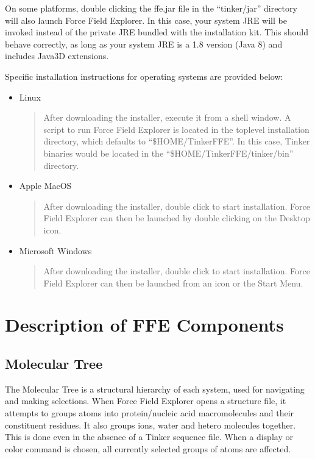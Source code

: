 \documentclass[letterpaper,11pt,english]{sphinxmanual}
\begin{document}
On some platforms, double clicking the ffe.jar file in the “tinker/jar” directory will also launch Force Field Explorer. In this case, your system JRE will be invoked instead of the private JRE bundled with the installation kit. This should behave correctly, as long as your system JRE is a 1.8 version (Java 8) and includes Java3D extensions.

Specific installation instructions for operating systems are provided below:
\begin{itemize}
\item {} 
Linux
\begin{quote}

After downloading the installer, execute it from a shell window. A script to run Force Field Explorer is located in the top\sphinxhyphen{}level installation directory, which defaults to “\$HOME/Tinker\sphinxhyphen{}FFE”. In this case, Tinker binaries would be located in the “\$HOME/Tinker\sphinxhyphen{}FFE/tinker/bin” directory.
\end{quote}

\item {} 
Apple MacOS
\begin{quote}

After downloading the installer, double click to start installation. Force Field Explorer can then be launched by double clicking on the Desktop icon.
\end{quote}

\item {} 
Microsoft Windows
\begin{quote}

After downloading the installer, double click to start installation. Force Field Explorer can then be launched from an icon or the Start Menu.
\end{quote}

\end{itemize}


\chapter{Description of FFE Components}
\label{\detokenize{text/components:description-of-ffe-components}}\label{\detokenize{text/components::doc}}

\section{Molecular Tree}
\label{\detokenize{text/components:molecular-tree}}
The Molecular Tree is a structural hierarchy of each system, used for navigating and making selections. When Force Field Explorer opens a structure file, it attempts to groups atoms into protein/nucleic acid macromolecules and their constituent residues. It also groups ions, water and hetero molecules together. This is done even in the absence of a Tinker sequence file. When a display or color command is chosen, all currently selected groups of atoms are affected.
\end{document}
